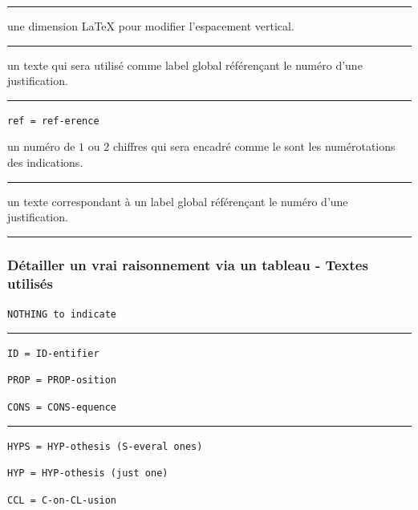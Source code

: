 \documentclass[12pt,a4paper]{article}
\theoremstyle{definition}
\newcommand\separation{
    \medskip
    \hfill\rule{0.5\textwidth}{0.75pt}\hfill
    \medskip
}
\newcommand\extraspace{
    \vspace{0.25em}
}
\newcommand\mwhyprefix[2]{%
    \texttt{#1 = #1-#2}%
}
\newcommand\prefix[1]{%
    \texttt{#1}%
}
\begin{document}
\separation



\IDoption{} une dimension \LaTeX{} pour modifier l'espacement vertical.


\separation



\IDoption{} un texte qui sera utilisé comme label global référençant le numéro d'une justification.


\separation


  \hfill \mwhyprefix{ref}{erence}

\IDarg{} un numéro de $1$ ou $2$ chiffres qui sera encadré comme le sont les numérotations des indications.


\separation



\IDarg{} un texte correspondant à un label global référençant le numéro d'une justification.


\separation






\subsubsection{Détailler un \og vrai \fg{} raisonnement via un tableau - Textes utilisés}

   \hfill \prefix{NOTHING to indicate}


\separation


     \hfill \mwhyprefix{ID}{entifier}


   \hfill \mwhyprefix{PROP}{osition}

   \hfill \mwhyprefix{CONS}{equence}


\separation


   \hfill \prefix{HYPS = HYP-othesis (S-everal ones)} 

    \hfill \prefix{HYP = HYP-othesis (just one)}

    \hfill \prefix{CCL = C-on-CL-usion}

\extraspace

\end{document}
